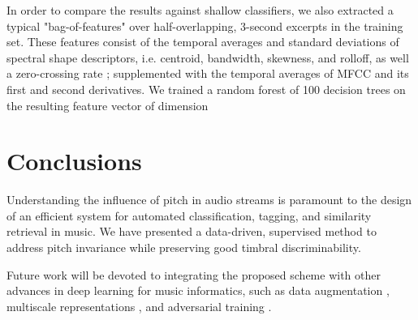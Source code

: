 \documentclass{article}
\makeatletter
\newcommand*{\ie}{i.e.\@\xspace}
\makeatother
\begin{document}
In order to compare the results against shallow classifiers, we also extracted a typical
"bag-of-features" over half-overlapping, 3-second excerpts in the training set.
These features consist of the temporal averages and standard
deviations of spectral shape descriptors, \ie centroid, bandwidth, skewness,
and rolloff, as well a zero-crossing rate ;
supplemented with the temporal averages of MFCC and its first and second derivatives.
We trained a random forest of 100 decision trees on the resulting feature vector
of dimension 
\section{Conclusions}
Understanding the influence of pitch in audio streams is paramount to the design of
an efficient system for automated classification, tagging, and similarity retrieval in music. 
We have presented a data-driven, supervised method to address pitch invariance
while preserving good timbral discriminability.


Future work will be devoted to integrating the proposed scheme with other advances
in deep learning for music informatics, such as data augmentation \cite{McFee2015-muda},
multiscale representations \cite{Hamel2012, Anden2015},
and adversarial training \cite{Kereliuk2015}.

\end{document}
